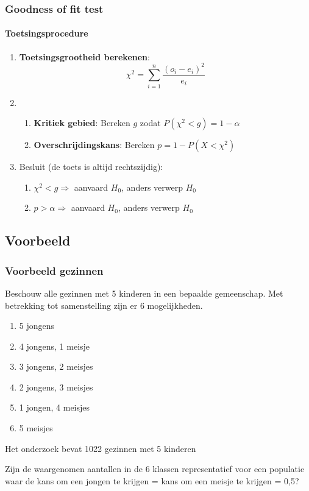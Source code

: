 \documentclass[aspectratio=169]{beamer}
\begin{document}
\begin{frame}
  \frametitle{Goodness of fit test}
  \framesubtitle{Toetsingsprocedure}
  
  \begin{enumerate}
    \item \textbf{Toetsingsgrootheid berekenen}:
    \[ \chi^{2} = \sum_{i=1}^{n} \frac{(o_{i} - e_{i})^{2}}{e_{i}} \]
    \item 
    \begin{enumerate}
      \item \textbf{Kritiek gebied}: Bereken $g$ zodat $P(\chi^2 < g) = 1 - \alpha$
      \item \textbf{Overschrijdingskans}: Bereken $p = 1 - P(X < \chi^2)$
    \end{enumerate}
    
    \item Besluit (de toets is altijd rechtszijdig):
    \begin{enumerate}
      \item $\chi^2 < g \Rightarrow$ aanvaard $H_0$, anders verwerp $H_0$
      \item $p > \alpha \Rightarrow$ aanvaard $H_0$, anders verwerp $H_0$
    \end{enumerate}
  \end{enumerate}
\end{frame}


\subsection{Voorbeeld}

\begin{frame}
  \frametitle{Voorbeeld gezinnen}
  Beschouw alle gezinnen met 5 kinderen in een bepaalde gemeenschap.
  \pause
  Met betrekking tot samenstelling zijn er 6 mogelijkheden.
  \begin{enumerate}
    \item 5 jongens
    \item 4 jongens, 1 meisje
    \item 3 jongens, 2 meisjes
    \item 2 jongens, 3 meisjes
    \item 1 jongen, 4 meisjes
    \item 5 meisjes
  \end{enumerate}
  Het onderzoek bevat 1022 gezinnen met 5 kinderen
  \begin{center}
    Zijn de waargenomen aantallen in de 6 klassen representatief voor een populatie waar de kans om een jongen te krijgen = kans om een meisje te krijgen = 0,5?
  \end{center}
\end{frame}
\end{document}
